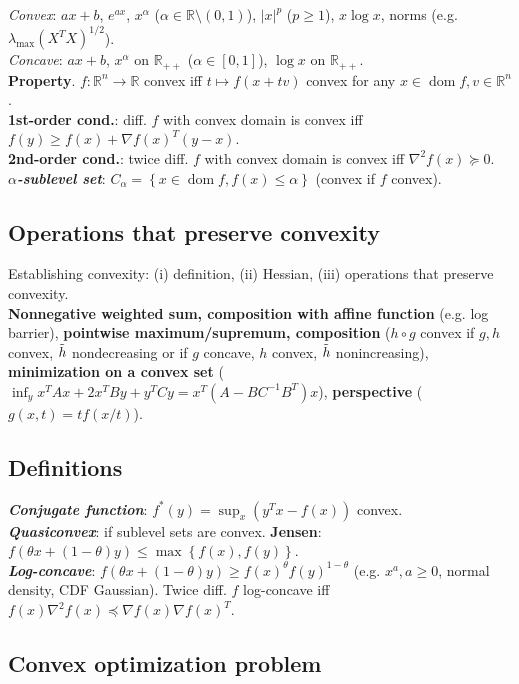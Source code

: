 \documentclass[a4paper, 11pt, twocolumn, landscape]{article}
\theoremstyle{lemma-style}
\theoremstyle{thm-style}
\theoremstyle{prop-style}
\theoremstyle{cor-style}
\newcommand{\R}{\mathbb{R}}
\newcommand{\Rn}{\mathbb{R}^{n}}
\DeclareMathOperator{\dom}{dom}
\renewcommand{\emph}[1]{\textbf{\textit{#1}}}
\begin{document}
\begin{small}
\textit{Convex}: $ax + b$, $e^{ax}$, $x^{\alpha}$ ($\alpha \in \R \setminus (0, 1)$), $|x|^p$ ($p \geq 1$), $x \log x$, norms (e.g. $\lambda_{\max}(X^TX)^{1/2}$). \\
\textit{Concave}: $ax + b$, $x^{\alpha}$ on $\R_{++}$ ($\alpha \in [0, 1]$), $\log x$ on $\R_{++}$. \\
\textbf{Property}. $f: \Rn \rightarrow \R$ convex iff $t \mapsto f(x + tv)$ convex for any $x \in \dom f, v \in \Rn$. \\
\textbf{1st-order cond.}: diff. $f$ with convex domain is convex iff $f(y) \geq f(x) + \nabla f(x)^T(y-x)$. \\
\textbf{2nd-order cond.}: twice diff. $f$ with convex domain is convex iff $\nabla^2 f(x) \succeq 0$. \\
\emph{$\alpha$-sublevel set}: $C_{\alpha} = \left\{ x \in \dom f, f(x) \leq \alpha \right\}$ (convex if $f$ convex).

    \subsection{Operations that preserve convexity}

Establishing convexity: (i) definition, (ii) Hessian, (iii) operations that preserve convexity. \\
\textbf{Nonnegative weighted sum, composition with affine function} (e.g. log barrier), \textbf{pointwise maximum/supremum, composition} ($h \circ g$ convex if $g, h$ convex, $\Tilde{h}$ nondecreasing or if $g$ concave, $h$ convex, $\Tilde{h}$ nonincreasing), \textbf{minimization on a convex set} ($\inf_y x^TAx + 2x^TBy + y^TCy = x^T(A-BC^{-1}B^T)x$), \textbf{perspective} ($g(x, t) = t f(x/t)$).

    \subsection{Definitions}

\emph{Conjugate function}: $f^{*}(y) = \sup_{x} \left( y^Tx - f(x) \right)$ convex. \\
\emph{Quasiconvex}: if sublevel sets are convex. \textbf{Jensen}: $f(\theta x + (1-\theta) y) \leq \max \left\{ f(x), f(y) \right\}$. \\
\emph{Log-concave}: $f( \theta x + (1-\theta)y) \geq f(x)^{\theta}f(y)^{1-\theta}$ (e.g. $x^a, a \geq 0$, normal density, CDF Gaussian). Twice diff. $f$ log-concave iff $f(x) \nabla^2 f(x) \preceq \nabla f(x) \nabla f(x)^T$.

    \subsection{Convex optimization problem}


\end{small}
\end{document}
